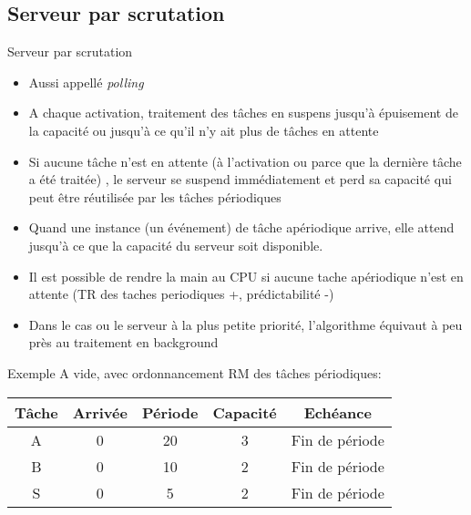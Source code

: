 \subsection{Serveur par scrutation}

\begin{frame}{Serveur par scrutation}
  \begin{itemize}
  \item Aussi appellé \emph{polling}
  \item A chaque activation,  traitement des tâches en suspens jusqu'à
    épuisement  de la capacité  ou jusqu'à  ce qu'il  n'y ait  plus de
    tâches en attente
  \item Si aucune tâche n'est  en attente (à l'activation ou parce que
    la  dernière  tâche  a  été  traitée)  ,  le  serveur  se  suspend
    immédiatement et perd sa capacité qui peut être réutilisée par les
    tâches périodiques
  \item Quand une instance (un événement) de tâche apériodique arrive,
    elle attend jusqu’à ce que la capacité du serveur soit disponible.
  \item  Il est  possible de  rendre la  main au  CPU si  aucune tache
    apériodique  n'est  en  attente  (TR  des  taches  periodiques  +,
    prédictabilité -)
  \item  Dans  le  cas  ou  le  serveur à  la  plus  petite  priorité,
    l'algorithme équivaut à peu près au traitement en background
  \end{itemize}
\end{frame} 

\begin{frame}{Exemple}
  A vide, avec ordonnancement RM des tâches périodiques:
  \begin{center}
    \begin{tabular}{ccccc}
      \hline
      Tâche & Arrivée & Période & Capacité & Echéance \\
      \hline
      A & 0 & 20 & 3 & Fin de période\\
      B & 0 & 10 & 2 & Fin de période\\
      S & 0 &  5 & 2 & Fin de période\\
      \hline
    \end{tabular}
  \end{center} 
 
\end{frame} 

